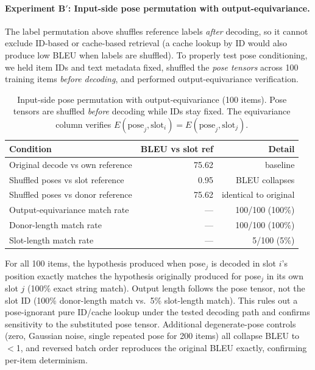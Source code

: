\documentclass[pdflatex,sn-chicago]{sn-jnl}
\begin{document}
\paragraph{Experiment B$'$: Input-side pose permutation with output-equivariance.}
\label{sec:input_permutation}
The label permutation above shuffles reference labels \emph{after} decoding, so it cannot exclude ID-based or cache-based retrieval (a cache lookup by ID would also produce low BLEU when labels are shuffled). To properly test pose conditioning, we held item IDs and text metadata fixed, shuffled the \emph{pose tensors} across 100 training items \emph{before decoding}, and performed output-equivariance verification.
\begin{table}[h]
\centering
\small
\caption{Input-side pose permutation with output-equivariance (100 items). Pose tensors are shuffled \emph{before} decoding while IDs stay fixed. The equivariance column verifies $E(\text{pose}_j, \text{slot}_i) = E(\text{pose}_j, \text{slot}_j)$.}
\label{tab:input_permutation}
\begin{tabular}{lrr}
\toprule
Condition & BLEU vs slot ref & Detail \\
\midrule
Original decode vs own reference & 75.62 & baseline \\
Shuffled poses vs slot reference & 0.95 & BLEU collapses \\
Shuffled poses vs donor reference & 75.62 & identical to original \\
\midrule
Output-equivariance match rate & --- & 100/100 (100\%) \\
Donor-length match rate & --- & 100/100 (100\%) \\
Slot-length match rate & --- & 5/100 (5\%) \\
\bottomrule
\end{tabular}
\end{table}
For all 100 items, the hypothesis produced when pose$_j$ is decoded in slot $i$'s position exactly matches the hypothesis originally produced for pose$_j$ in its own slot $j$ (100\% exact string match). Output length follows the pose tensor, not the slot ID (100\% donor-length match vs.\ 5\% slot-length match). This rules out a pose-ignorant pure ID/cache lookup under the tested decoding path and confirms sensitivity to the substituted pose tensor. Additional degenerate-pose controls (zero, Gaussian noise, single repeated pose for 200 items) all collapse BLEU to $<$1, and reversed batch order reproduces the original BLEU exactly, confirming per-item determinism.
\end{document}
